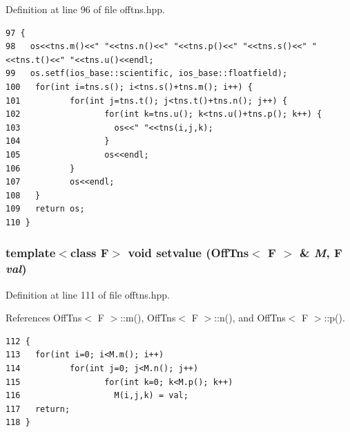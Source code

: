 Definition at line 96 of file offtns.hpp.

\footnotesize\begin{verbatim}97 {
98   os<<tns.m()<<" "<<tns.n()<<" "<<tns.p()<<" "<<tns.s()<<" "<<tns.t()<<" "<<tns.u()<<endl;
99   os.setf(ios_base::scientific, ios_base::floatfield);
100   for(int i=tns.s(); i<tns.s()+tns.m(); i++) {
101          for(int j=tns.t(); j<tns.t()+tns.n(); j++) {
102                 for(int k=tns.u(); k<tns.u()+tns.p(); k++) {
103                   os<<" "<<tns(i,j,k);
104                 }
105                 os<<endl;
106          }
107          os<<endl;
108   }
109   return os;
110 }
\end{verbatim}\normalsize 


\subsubsection{\setlength{\rightskip}{0pt plus 5cm}template$<$class F$>$ void setvalue ({\bf Off\-Tns}$<$ F $>$ \& {\em M}, F {\em val})\hspace{0.3cm}{\tt  [inline]}}\label{offtns_8hpp_c37306574c0413d3d9adc186a662b6b1_c37306574c0413d3d9adc186a662b6b1}




Definition at line 111 of file offtns.hpp.

References Off\-Tns$<$ F $>$::m(), Off\-Tns$<$ F $>$::n(), and Off\-Tns$<$ F $>$::p().

\footnotesize\begin{verbatim}112 {
113   for(int i=0; i<M.m(); i++)
114          for(int j=0; j<M.n(); j++)
115                 for(int k=0; k<M.p(); k++)
116                   M(i,j,k) = val;
117   return;
118 }
\end{verbatim}\normalsize 


